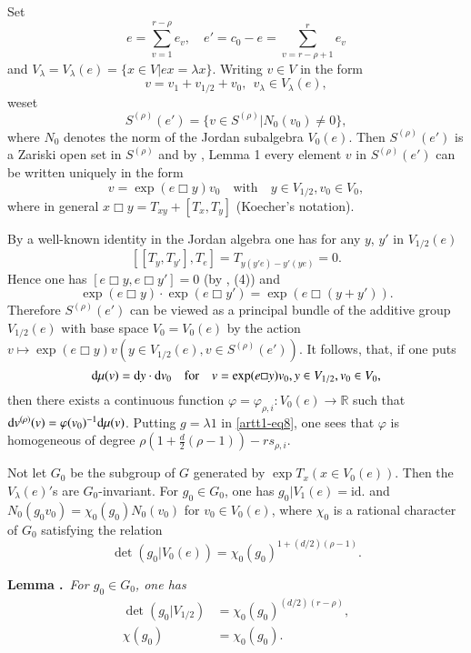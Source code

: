 Set
$$
e=\sum\limits^{r-\rho}_{v=1}e_{v},\quad e'=c_{0}-e=\sum\limits^{r}_{v=r-\rho+1}e_{v}
$$
and $V_{\lambda}=V_{\lambda}(e)=\{x\in V|ex=\lambda x\}$. Writing $v\in V$ in the form
$$
v=v_{1}+v_{1/2}+v_{0}, \ \ v_{\lambda}\in V_{\lambda}(e),
$$
we\pageoriginale set
\begin{equation}
S^{(\rho)}(e')=\{v\in S^{(\rho)}|N_{0}(v_{0})\neq 0\},\label{art11-eq9}
\end{equation}
where $N_{0}$ denotes the norm of the Jordan subalgebra $V_{0}(e)$. Then $S^{(\rho)}(e')$ is a Zariski open set in $S^{(\rho)}$ and by \cite{art11-keyS3}, Lemma 1 every element $v$ in $S^{(\rho)}(e')$ can be written uniquely in the form
\begin{equation}
v=\exp(e\Box y)v_{0}\quad\text{with}\quad y\in V_{1/2}, v_{0}\in V_{0},\label{art11-eq10}
\end{equation}
where in general $x\Box y=T_{xy}+[T_{x},T_{y}]$ (Koecher's notation).

By a well-known identity in the Jordan algebra one has for any $y$, $y'$ in $V_{1/2}(e)$
$$
[[T_{y},T_{y'}],T_{e}]=T_{y(y'e)-y'(ye)}=0.
$$
Hence one has $[e\Box y, e\Box y']=0$ (by \cite{art11-key11S3}, (4)) and
$$
\exp(e\Box y)\cdot \exp (e\Box y')=\exp(e\Box (y+y')).
$$
Therefore $S^{(\rho)}(e')$ can be viewed as a principal bundle of the additive group $V_{1/2}(e)$ with base space $V_{0}=V_{0}(e)$ by the action $v\mapsto \exp(e\Box y)v(y\in V_{1/2}(e),v\in S^{(\rho)}(e'))$. It follows, that, if one puts
$$
\mathrm{d} \mu(v)=\mathrm{d} y\cdot \mathrm{d} v_{0}\quad\text{for}\quad v=\exp(e\Box y)v_{0}, y\in V_{1/2}, v_{0}\in V_{0},
$$
then there exists a continuous function $\varphi=\varphi_{\rho,i}:V_{0}(e)\to \mathbb{R}$ such that $\mathrm{d} v^{(\rho)}(v)=\varphi(v_{0})^{-1}\mathrm{d} \mu(v)$. Putting $g=\lambda 1$ in \eqref{artt1-eq8}, one sees that $\varphi$ is homogeneous of degree $\rho(1+\frac{d}{2}(\rho-1))-rs_{\rho,i}$.

Not let $G_{0}$ be the subgroup of $G$ generated by $\exp T_{x}(x\in V_{0}(e))$. Then the $V_{\lambda}(e)'$s are $G_{0}$-invariant. For $g_{0}\in G_{0}$, one has $g_{0}|V_{1}(e)=\text{id.}$ and $N_{0}(g_{0}v_{0})=\chi_{0}(g_{0})N_{0}(v_{0})$ for $v_{0}\in V_{0}(e)$, where $\chi_{0}$ is a rational character of $G_{0}$ satisfying the relation
\begin{equation}
\det (g_{0}|V_{0}(e))=\chi_{0}(g_{0})^{1+(d/2)(\rho-1)}.\label{art11-eq11}
\end{equation}

\medskip
\noindent
{\bf Lemma .\label{art11-lem2}}~{\em For $g_{0}\in G_{0}$, one has}
\begin{align}
\det (g_{0}|V_{1/2}) &= \chi_{0}(g_{0})^{(d/2)(r-\rho)},\label{art11-eq12}\\
\chi(g_{0}) &=\chi_{0}(g_{0}).\label{art11-eq13}
\end{align}

